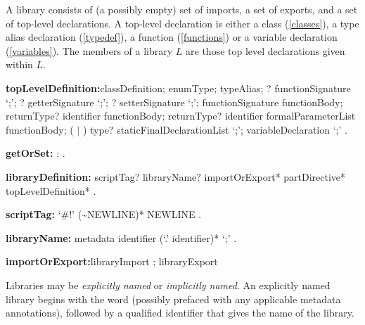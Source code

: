 \documentclass{article}
\begin{document}
\LMHash{}
A library consists of (a possibly empty) set of imports, a set of exports,  and a set of top-level declarations. A top-level declaration is either a class (\ref{classes}), a type alias declaration (\ref{typedef}), a function (\ref{functions}) or a variable declaration (\ref{variables}). The members of a library $L$ are those top level declarations given within $L$.

 \begin{grammar}
{\bf topLevelDefinition:}classDefinition;
     enumType;
      typeAlias;
      \EXTERNAL{}? functionSignature `{\escapegrammar ;}';
      \EXTERNAL{}? getterSignature `{\escapegrammar ;}';
      \EXTERNAL{}? setterSignature `{\escapegrammar ;}';      
      functionSignature functionBody;
      returnType? \GET{} identifier functionBody;
      returnType? \SET{} identifier formalParameterList functionBody;
      (\FINAL{} $|$ \CONST{}) type? staticFinalDeclarationList `{\escapegrammar ;}';
      variableDeclaration `{\escapegrammar ;}'
    .
    
    {\bf getOrSet:} \GET{};
      \SET{}
    .



{\bf libraryDefinition:}
      scriptTag? libraryName? importOrExport* partDirective* topLevelDefinition*
    .
    
    {\bf     scriptTag:}
   `\#!' {\escapegrammar (\~{}NEWLINE)*} NEWLINE
 .    

{\bf libraryName:}
   metadata \LIBRARY{} identifier (`{\escapegrammar .}' identifier)* `{\escapegrammar ;}'
   .

{\bf importOrExport:}libraryImport ;
  libraryExport   
 \end{grammar}
 
\LMHash{}
 Libraries may be {\em explicitly named} or {\em implicitly named}. An explicitly named library begins with  the  word \LIBRARY{} (possibly prefaced with any applicable metadata annotations), followed by a qualified identifier that gives the name of the library.
 
 
\end{document}
